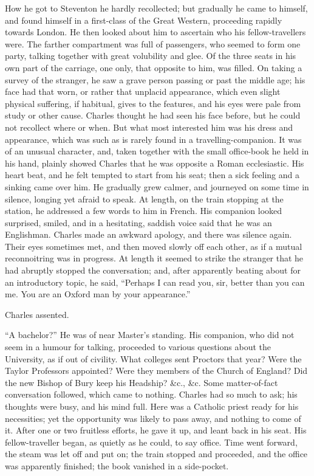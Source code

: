 How he got to Steventon he hardly recollected; but gradually he
came to himself, and found himself in a first-class of the Great
Western, proceeding rapidly towards London. He then looked about
him to ascertain who his fellow-travellers were. The farther
compartment was full of passengers, who seemed to form one party,
talking together with great volubility and glee. Of the three seats in
his own part of the carriage, one only, that opposite to him, was
filled. On taking a survey of the stranger, he saw a grave person
passing or past the middle age; his face had that worn, or rather that
unplacid appearance, which even slight physical suffering, if
habitual, gives to the features, and his eyes were pale from study or
other cause. Charles thought he had seen his face before, but he could
not recollect where or when. But what most interested him was his
dress and appearance, which was such as is rarely found in a
travelling-companion. It was of an unusual character, and, taken
together with the small office-book he held in his hand, plainly
showed Charles that he was opposite a Roman ecclesiastic. His heart
beat, and he felt tempted to start from his seat; then a sick feeling
and a sinking came over him. He gradually grew calmer, and journeyed
on some time in silence, longing yet afraid to speak. At length, on
the train stopping at the station, he addressed a few words to him in
French. His companion looked surprised, smiled, and in a hesitating,
saddish voice said that he was an Englishman. Charles made an awkward
apology, and there was silence again. Their eyes sometimes met, and
then moved slowly off each other, as if a mutual reconnoitring was in
progress. At length it seemed to strike the stranger that he had
abruptly stopped the conversation; and, after apparently beating
about for an introductory topic, he said, ``Perhaps I can read
you, sir, better than you can me. You are an Oxford man by your
appearance.''

Charles assented.

``A bachelor?'' He was of near Master's standing. His
companion, who did not seem in a humour for talking, proceeded to
various questions about the University, as if out of civility. What
colleges sent Proctors that year? Were the Taylor Professors
appointed? Were they members of the Church of England? Did the new
Bishop of Bury keep his Headship? \&c., \&c. Some matter-of-fact
conversation followed, which came to nothing. Charles had so much to
ask; his thoughts were busy, and his mind full. Here was a Catholic
priest ready for his necessities; yet the opportunity was likely to
pass away, and nothing to come of it. After one or two fruitless
efforts, he gave it up, and leant back in his seat. His fellow-traveller
began, as quietly as he could, to say office. Time went forward, the
steam was let off and put on; the train stopped and proceeded, and the
office was apparently finished; the book vanished in a side-pocket.

